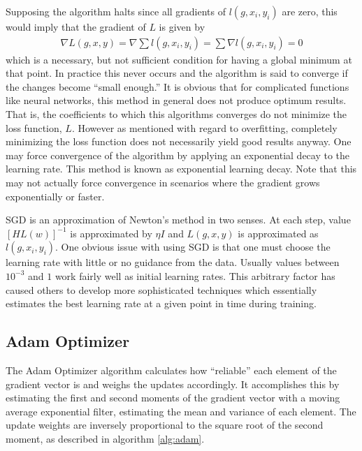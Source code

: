 Supposing the algorithm halts since all gradients of $l(g,x_i,y_i)$ are zero, this would imply that the gradient of $L$ is given by
\begin{align}
\nabla L(g,x,y) = \nabla \sum l(g,x_i,y_i) = \sum \nabla l(g,x_i,y_i) = 0
\end{align}
 which is a necessary, but not sufficient condition for having a global minimum at that point.  In practice this never occurs and the algorithm is said to converge if the changes become ``small enough.''  It is obvious that for complicated functions like neural networks, this method in general does not produce optimum results.  That is, the coefficients to which this algorithms converges do not minimize the loss function, $L$.  However as mentioned with regard to overfitting, completely minimizing the loss function does not necessarily yield good results anyway.  One may force convergence of the algorithm by applying an exponential decay to the learning rate.  This method is known as exponential learning decay.  Note that this may not actually force convergence in scenarios where the gradient grows exponentially or faster.  

SGD is an approximation of Newton's method in two senses.  At each step, value $[HL(w)]^{-1}$ is approximated by $\eta I$ and $L(g,x,y)$ is approximated as $l(g,x_i,y_i)$.  One obvious issue with using SGD is that one must choose the learning rate with little or no guidance from the data.  Usually values between $10^{-3}$ and $1$ work fairly well as initial learning rates.  This arbitrary factor has caused others to develop more sophisticated techniques which essentially estimates the best learning rate at a given point in time during training.

\subsection{Adam Optimizer}
The Adam Optimizer algorithm \cite{pd14} calculates how ``reliable'' each element of the gradient vector is and weighs the updates accordingly.  It accomplishes this by estimating the first and second moments of the gradient vector with a moving average exponential filter, estimating the mean and variance of each element.  The update weights are inversely proportional to the square root of the second moment, as described in algorithm \ref{alg:adam}.

